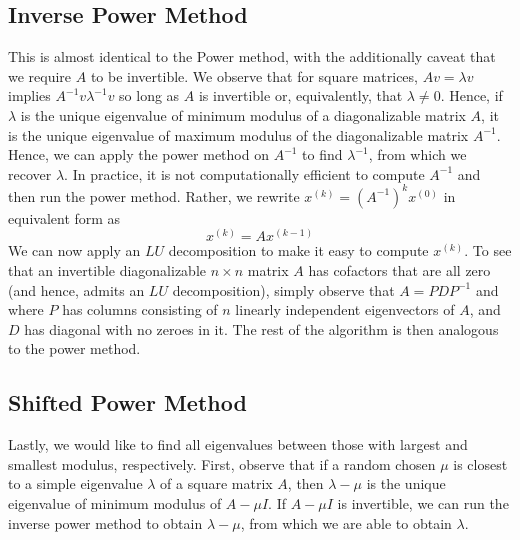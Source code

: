 \documentclass[12pt]{article}
\theoremstyle{plain}
\theoremstyle{definition}
\theoremstyle{remark}
\numberwithin{equation}{section}  %
\begin{document}
\subsection{Inverse Power Method}
This is almost identical to the Power method, with the additionally caveat that
we require $A$ to be invertible. We observe that for square matrices, $Av =
\lambda v$ implies $A^{-1}v \lambda^{-1}v$ so long as $A$ is invertible or,
equivalently, that $\lambda \neq 0$. Hence, if $\lambda$ is the unique
eigenvalue of minimum modulus of a diagonalizable matrix $A$, it is the
unique eigenvalue of maximum modulus of the diagonalizable matrix $A^{-1}$.
Hence, we can apply the power method on $A^{-1}$ to find $\lambda^{-1}$, from
which we recover $\lambda$. In practice, it is not computationally efficient to
compute $A^{-1}$ and then run the power method. Rather, we 
rewrite $x^{(k)} = (A^{-1})^k x^{(0)}$ in equivalent form as
\begin{equation*}
x^{(k)} = Ax^{(k-1)}
\end{equation*}
We can now apply an $LU$ decomposition to make it easy to compute $x^{(k)}$.
To see that an invertible diagonalizable $n \times n$ matrix $A$ has cofactors that are all
zero (and hence, admits an $LU$ decomposition), simply observe that $A = PDP^{-1}$ and
where $P$ has columns consisting of $n$ linearly independent
eigenvectors of $A$, and $D$ has diagonal with no zeroes in it. 
The rest of the algorithm is then analogous to the power method.
\subsection{Shifted Power Method}	
Lastly, we would like to find all eigenvalues between those with largest and
smallest modulus, respectively. First, observe that if a random chosen $\mu$ is
closest to a simple eigenvalue $\lambda$ of a square matrix $A$, then $\lambda -
\mu$ is the unique eigenvalue of minimum modulus of $A - \mu I$. If $A - \mu I$
is invertible, we can run the inverse power method to obtain $\lambda - \mu$,
from which we are able to obtain $\lambda$.
\end{document}

